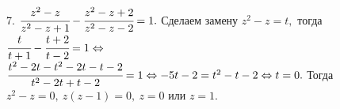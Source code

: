 7. $\cfrac{z^2-z}{z^2-z+1}-\cfrac{z^2-z+2}{z^2-z-2}=1.$ Сделаем замену $z^2-z=t,$ тогда $\cfrac{t}{t+1}-\cfrac{t+2}{t-2}=1
\Leftrightarrow$\\$ \cfrac{t^2-2t-t^2-2t-t-2}{t^2-2t+t-2}=1\Leftrightarrow -5t-2=t^2-t-2\Leftrightarrow t=0.$ Тогда
$z^2-z=0,\ z(z-1)=0,\ z=0$ или $z=1.$\\

